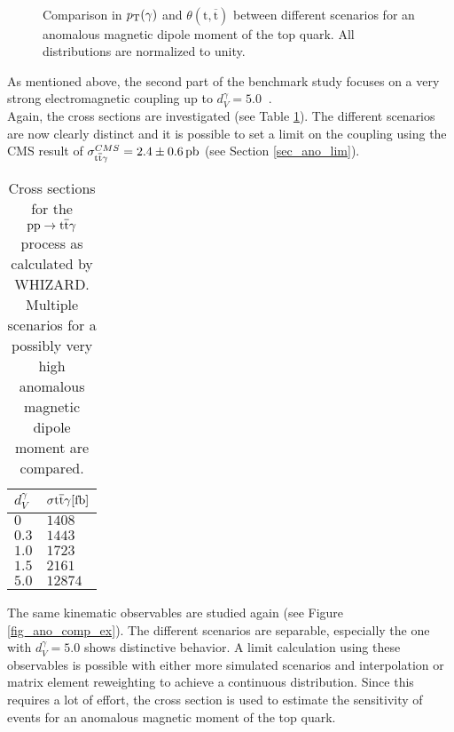 \begin{figure}[ht]
\centering
  \\
  \caption{Comparison in $p_{\mathrm{T}} (\gamma)$ and $\theta (\mathrm{t},\overline{\mathrm{t}})$ between different scenarios for an anomalous magnetic dipole moment of the top quark. All distributions are normalized to unity.}
  \label{fig_ano_comp_2}
\end{figure}

As mentioned above, the second part of the benchmark study focuses on a very strong electromagnetic coupling up to $d_V^{\gamma} = \SI{5.0}{}$ . \\
Again, the cross sections are investigated (see Table \ref{tab_ano_crosssec_ex}). The different scenarios are now clearly distinct and it is possible to set a limit on the coupling using the CMS result of $\sigma^{CMS}_{\ttgamma} = \SI{2.4 \pm 0.6}{\pico \barn}$\cite{CMS-PAS-TOP-13-011} (see Section \ref{sec_ano_lim}). \\

\begin{table}[ht]
\centering
    \caption{Cross sections for the $\mathrm{pp} \to \mathrm{t}\overline{\mathrm{t}} \gamma$ process as calculated by WHIZARD. Multiple scenarios for a possibly very high anomalous magnetic dipole moment are compared.}
    \begin{tabular}{| l | l |}

    \hline
    $d_{V}^{\gamma}$ & $\sigma{\ttgamma} [\SI{}{\femto \barn}]$ \\
    \hline
    $0$ &  $1408$\\
    \hline
    $0.3$ & $1443 $ \\
    \hline
    $1.0$ & $1723 $ \\
    \hline
    $1.5$ & $2161 $ \\
    \hline
    $5.0$ &  $12874 $\\
    \hline
    \end{tabular}
     \label{tab_ano_crosssec_ex}
\end{table}

The same kinematic observables are studied again (see Figure \ref{fig_ano_comp_ex}). The different scenarios are separable, especially the one with $d_{V}^{\gamma} = 5.0$ shows distinctive behavior. A limit calculation using these observables is possible with either more simulated scenarios and interpolation or  matrix element reweighting to achieve a continuous distribution. Since this requires a lot of effort, the cross section is used to estimate the sensitivity of \ttgamma events for an anomalous magnetic moment of the top quark.

